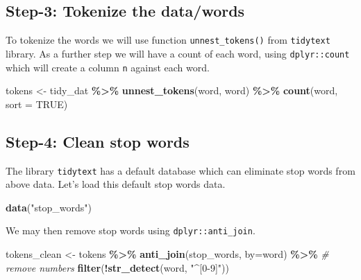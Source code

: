 \documentclass[
]{book}
\newenvironment{Shaded}{\begin{snugshade}}{\end{snugshade}}
\newcommand{\AttributeTok}[1]{\textcolor[rgb]{0.13,0.29,0.53}{#1}}
\newcommand{\CommentTok}[1]{\textcolor[rgb]{0.56,0.35,0.01}{\textit{#1}}}
\newcommand{\ConstantTok}[1]{\textcolor[rgb]{0.56,0.35,0.01}{#1}}
\newcommand{\FunctionTok}[1]{\textcolor[rgb]{0.13,0.29,0.53}{\textbf{#1}}}
\newcommand{\NormalTok}[1]{#1}
\newcommand{\OtherTok}[1]{\textcolor[rgb]{0.56,0.35,0.01}{#1}}
\newcommand{\SpecialCharTok}[1]{\textcolor[rgb]{0.81,0.36,0.00}{\textbf{#1}}}
\newcommand{\StringTok}[1]{\textcolor[rgb]{0.31,0.60,0.02}{#1}}
\begin{document}
\hypertarget{step-3-tokenize-the-datawords}{%
\subsection{Step-3: Tokenize the data/words}\label{step-3-tokenize-the-datawords}}

To tokenize the words we will use function \texttt{unnest\_tokens()} from \texttt{tidytext} library. As a further step we will have a count of each word, using \texttt{dplyr::count} which will create a column \texttt{n} against each word.

\begin{Shaded}
\begin{Highlighting}[]
\NormalTok{tokens }\OtherTok{\textless{}{-}}\NormalTok{ tidy\_dat }\SpecialCharTok{\%\textgreater{}\%} 
  \FunctionTok{unnest\_tokens}\NormalTok{(word, word) }\SpecialCharTok{\%\textgreater{}\%} 
  \FunctionTok{count}\NormalTok{(word, }\AttributeTok{sort =} \ConstantTok{TRUE}\NormalTok{) }
\end{Highlighting}
\end{Shaded}

\hypertarget{step-4-clean-stop-words}{%
\subsection{Step-4: Clean stop words}\label{step-4-clean-stop-words}}

The library \texttt{tidytext} has a default database which can eliminate stop words from above data. Let's load this default stop words data.

\begin{Shaded}
\begin{Highlighting}[]
\FunctionTok{data}\NormalTok{(}\StringTok{"stop\_words"}\NormalTok{)}
\end{Highlighting}
\end{Shaded}

We may then remove stop words using \texttt{dplyr::anti\_join}.

\begin{Shaded}
\begin{Highlighting}[]
\NormalTok{tokens\_clean }\OtherTok{\textless{}{-}}\NormalTok{ tokens }\SpecialCharTok{\%\textgreater{}\%}
  \FunctionTok{anti\_join}\NormalTok{(stop\_words, }\AttributeTok{by=}\StringTok{\textquotesingle{}word\textquotesingle{}}\NormalTok{) }\SpecialCharTok{\%\textgreater{}\%} 
  \CommentTok{\# remove numbers}
  \FunctionTok{filter}\NormalTok{(}\SpecialCharTok{!}\FunctionTok{str\_detect}\NormalTok{(word, }\StringTok{"\^{}[0{-}9]"}\NormalTok{))}
\end{Highlighting}
\end{Shaded}
\end{document}
